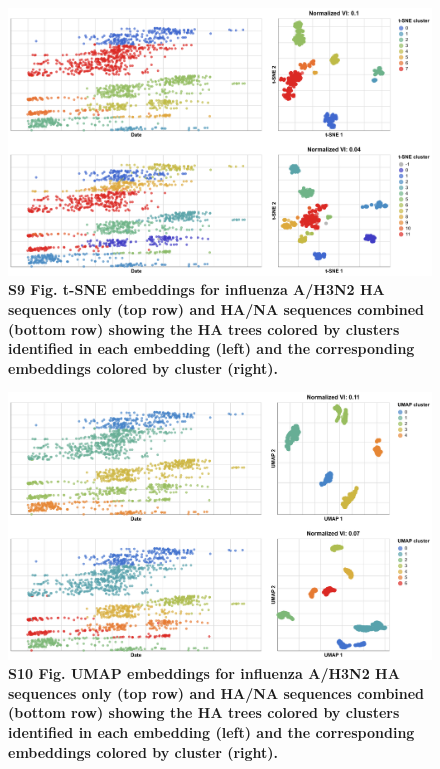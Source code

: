 \documentclass[10pt,letterpaper]{article}
\begin{document}
\begin{figure}[!h]
\includegraphics[width=\columnwidth]{figures/flu-2016-2018-ha-na-tsne-by-cluster.png}
\caption*{{\bf S9 Fig. t-SNE embeddings for influenza A/H3N2 HA sequences only (top row) and HA/NA sequences combined (bottom row) showing the HA trees colored by clusters identified in each embedding (left) and the corresponding embeddings colored by cluster (right).}}
\end{figure}

\begin{figure}[!h]
\includegraphics[width=\columnwidth]{figures/flu-2016-2018-ha-na-umap-by-cluster.png}
\caption*{{\bf S10 Fig. UMAP embeddings for influenza A/H3N2 HA sequences only (top row) and HA/NA sequences combined (bottom row) showing the HA trees colored by clusters identified in each embedding (left) and the corresponding embeddings colored by cluster (right).}}
\end{figure}
\end{document}
